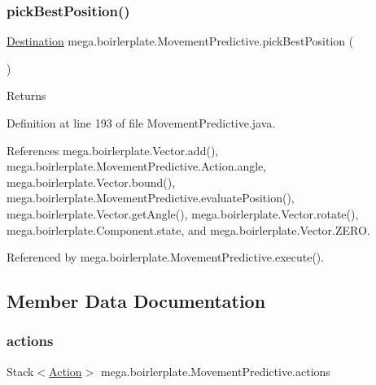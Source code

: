 \subsubsection{\texorpdfstring{pick\+Best\+Position()}{pickBestPosition()}}
{\footnotesize\ttfamily \hyperlink{classmega_1_1boirlerplate_1_1_movement_predictive_1_1_destination}{Destination} mega.\+boirlerplate.\+Movement\+Predictive.\+pick\+Best\+Position (\begin{DoxyParamCaption}{ }\end{DoxyParamCaption})\hspace{0.3cm}{\ttfamily [private]}}

\begin{DoxyReturn}{Returns}

\end{DoxyReturn}


Definition at line 193 of file Movement\+Predictive.\+java.



References mega.\+boirlerplate.\+Vector.\+add(), mega.\+boirlerplate.\+Movement\+Predictive.\+Action.\+angle, mega.\+boirlerplate.\+Vector.\+bound(), mega.\+boirlerplate.\+Movement\+Predictive.\+evaluate\+Position(), mega.\+boirlerplate.\+Vector.\+get\+Angle(), mega.\+boirlerplate.\+Vector.\+rotate(), mega.\+boirlerplate.\+Component.\+state, and mega.\+boirlerplate.\+Vector.\+Z\+E\+RO.



Referenced by mega.\+boirlerplate.\+Movement\+Predictive.\+execute().



\subsection{Member Data Documentation}
\mbox{\label{classmega_1_1boirlerplate_1_1_movement_predictive_a65e6ad38f9fb6062584415126f356b29}} 
\subsubsection{\texorpdfstring{actions}{actions}}
{\footnotesize\ttfamily Stack$<$\hyperlink{classmega_1_1boirlerplate_1_1_movement_predictive_1_1_action}{Action}$>$ mega.\+boirlerplate.\+Movement\+Predictive.\+actions\hspace{0.3cm}{\ttfamily [private]}}



